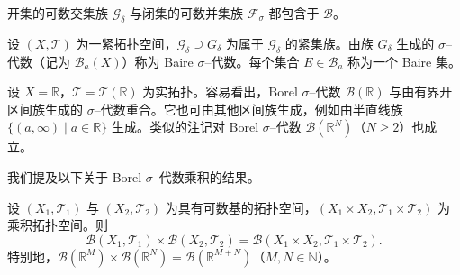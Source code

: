 \documentclass[../../main.tex]{subfiles}%
\begin{document}
\begin{example}\label{example:ch01-GdeltaFsigma}
开集的可数交集族 $\mathcal{G}_\delta$ 与闭集的可数并集族 $\mathcal{F}_\sigma$ 都包含于 $\mathcal{B}$。
\end{example}

\begin{definition}\label{definition:ch01-Baire代数}
设 $(X,\mathcal{T})$ 为一紧拓扑空间，$\mathcal{G}_\delta\supseteq G_\delta$ 为属于 $\mathcal{G}_\delta$ 的紧集族。由族 $G_\delta$ 生成的 $\sigma$--代数（记为 $\mathcal{B}_a(X)$）称为 Baire $\sigma$--代数。每个集合 $E\in\mathcal{B}_a$ 称为一个 Baire 集。
\end{definition}

\begin{remark}\label{remark:ch01-实直线Borel}
设 $X=\mathbb{R}$，$\mathcal{T}=\mathcal{T}(\mathbb{R})$ 为实拓扑。容易看出，Borel $\sigma$--代数 $\mathcal{B}(\mathbb{R})$ 与由有界开区间族生成的 $\sigma$--代数重合。它也可由其他区间族生成，例如由半直线族 $\{(a,\infty)\mid a\in\mathbb{R}\}$ 生成。类似的注记对 Borel $\sigma$--代数 $\mathcal{B}(\mathbb{R}^N)$（$N\geqslant 2$）也成立。
\end{remark}

我们提及以下关于 Borel $\sigma$--代数乘积的结果。

\begin{theorem}\label{theorem:ch01-Borel乘积}\label{theorem:ch01-Borel积}
设 $(X_1,\mathcal{T}_1)$ 与 $(X_2,\mathcal{T}_2)$ 为具有可数基的拓扑空间，$(X_1\times X_2,\mathcal{T}_1\times\mathcal{T}_2)$ 为乘积拓扑空间。则
\[
\mathcal{B}(X_1,\mathcal{T}_1)\times\mathcal{B}(X_2,\mathcal{T}_2)=\mathcal{B}(X_1\times X_2,\mathcal{T}_1\times\mathcal{T}_2).
\]
特别地，$\mathcal{B}(\mathbb{R}^M)\times\mathcal{B}(\mathbb{R}^N)=\mathcal{B}(\mathbb{R}^{M+N})$（$M,N\in\mathbb{N}$）。
\end{theorem}
\end{document}
